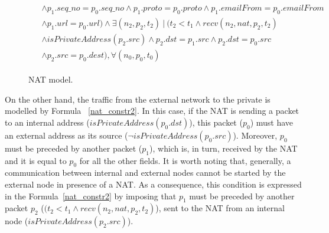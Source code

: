 \begin{figure}[h]
{\begin{subequations}
\begin{align}
\begin{split}
			& \wedge p_{1}.seq\_no = p_{0}.seq\_no \wedge p_{1}.proto = p_{0}.proto \wedge p_{1}.emailFrom = p_{0}.emailFrom \\
			& \wedge p_{1}.url = p_{0}.url) \wedge \exists (n_{2}, p_{2}, t_{2}) \: | \: (t_{2} < t_{1} \wedge recv(n_{2}, nat, p_{2}, t_{2}) \\
			& \wedge isPrivateAddress(p_{2}.src) \wedge p_{2}.dst = p_{1}.src \wedge p_{2}.dst = p_{0}.src \\
			& \wedge p_{2}.src = p_{0}.dest), \forall (n_{0}, p_{0}, t_{0})
			\end{split}
			\end{align}
		\end{subequations}
	}%
	\caption{NAT model.}
	\label{nat_model}
\end{figure}
On the other hand, the traffic from the external network to the private is modelled by Formula ~\ref{nat_constr2}. In this case, if the NAT is sending a packet to an internal address (\textit{$isPrivateAddress(p_{0}.dst)$}), this packet (\textit{$p_0$}) must have an external address as its source (\textit{$\neg isPrivateAddress(p_{0}.src)$}). Moreover, \textit{$p_0$} must be preceded by another packet (\textit{$p_1$}), which is, in turn, received by the NAT and it is equal to \textit{$p_0$} for all the other fields. It is worth noting that, generally, a communication between internal and external nodes cannot be started by the external node in presence of a NAT. As a consequence, this condition is expressed in the Formula~\ref{nat_constr2} by imposing that \textit{$p_1$} must be preceded by another packet \textit{$p_2$} (\textit{$(t_{2} < t_{1} \wedge recv(n_{2}, nat, p_{2}, t_{2})$}), sent to the NAT from an internal node (\textit{$isPrivateAddress(p_{2}.src)$}).

